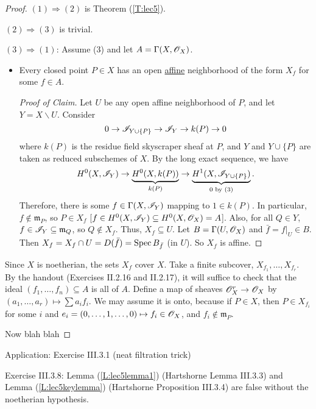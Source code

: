 \begin{proof}
$(1)\Rightarrow (2)$ is Theorem (\ref{T:lec5}).

$(2)\Rightarrow (3)$ is trivial.

$(3)\Rightarrow (1)$:  Assume (3) and let $A=\Gamma(X,\mathscr{O}_X)$.
\vspace{-5mm}
\begin{itemize}
\item[] \begin{claim} Every closed point $P\in X$ has an open
\underline{affine} neighborhood of the form $X_f$ for some $f\in
A$.
\end{claim}
\begin{proof}[Proof of Claim]
Let $U$ be any open affine neighborhood of $P$, and let
$Y=X\smallsetminus U$.  Consider
\[
    0\to \mathscr{I}_{Y\cup \{P\}} \to \mathscr{I}_Y \to k(P) \to 0
\]
where $k(P)$ is the residue field skyscraper sheaf at $P$, and $Y$
and $Y\cup \{P\}$ are taken as reduced subschemes of $X$.  By the
long exact sequence, we have
\[
    H^0(X,\mathscr{I}_Y)\to \underbrace{H^0(X,k(P))}_{k(P)} \to
    \underbrace{H^1(X,\mathscr{I}_{Y\cup\{P\}})}_{0 \text{ by }(3)}.
\]
Therefore, there is some $f\in \Gamma(X,\mathscr{I}_Y)$ mapping to $1\in
k(P)$.  In particular, $f\not\in \mathfrak{m}_P$, so $P\in X_f$
[$f\in H^0(X,\mathscr{I}_Y)\subseteq H^0(X,\mathscr{O}_X)=A$].  Also, for all $Q\in
Y$, $f\in \mathscr{I}_Y \subseteq \mathfrak{m}_Q$, so $Q\not\in X_f$. Thus,
$X_f\subseteq U$.  Let $B=\Gamma(U,\mathscr{O}_X)$ and $\bar f=f|_U\in B$.
Then $X_f=X_f\cap U=D(\bar f) = \text{\rm Spec\,} B_{\bar f}$ (in $U$).  So
$X_f$ is affine.
\renewcommand{\qedsymbol}{$\square_{\text{Claim}}$}
\end{proof}
\end{itemize}
Since $X$ is noetherian, the sets $X_f$ cover $X$.  Take a finite
subcover, $X_{f_1},\dots,X_{f_r}$.  By the handout (Exercises
II.2.16 and II.2.17), it will suffice to check that the ideal
$(f_1,\dots,f_n)\subseteq A$ is all of $A$.  Define a map of
sheaves $\mathscr{O}_X^r\to \mathscr{O}_X$ by $(a_1,\dots,a_r)\mapsto \sum a_if_i$.
We may assume it is onto, because if $P\in X$, then $P\in X_{f_i}$
for some $i$ and $e_i = (0,\dots, 1,\dots, 0)\mapsto f_i\in \mathscr{O}_X$,
and $f_i\not\in \mathfrak{m}_P$.

Now blah blah 
\end{proof}

Application: Exercise III.3.1 (neat filtration trick)

Exercise III.3.8: Lemma (\ref{L:lec5lemma1}) (Hartshorne Lemma
III.3.3) and Lemma (\ref{L:lec5keylemma}) (Hartshorne Proposition
III.3.4) are false without the noetherian hypothesis.

